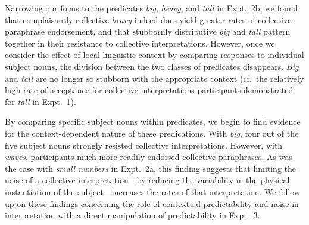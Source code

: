 \documentclass[linguex]{sp}
\newcommand{\ndg}[1]{\textcolor{Green}{[ndg: #1]}}
\begin{document}

Narrowing our focus to the predicates \emph{big}, \emph{heavy}, and \emph{tall} in Expt.~2b, we found that complaisantly collective \emph{heavy} indeed does yield greater rates of collective paraphrase endorsement, and that stubbornly distributive \emph{big} and \emph{tall} pattern together in their resistance to collective interpretations. However, once we consider the effect of local linguistic context by comparing responses to individual subject nouns, the division between the two classes of predicates disappears. \emph{Big} and \emph{tall} are no longer so stubborn with the appropriate context (cf.~the relatively high rate of acceptance for collective interpretations participants demonstrated for \emph{tall} in Expt.~1).



By comparing specific subject nouns within predicates, we begin to find evidence for the context-dependent nature of these predications. With \emph{big}, four out of the five subject nouns strongly resisted collective interpretations. However, with \emph{waves}, participants much more readily endorsed collective paraphrases. As was the case with \emph{small numbers} in Expt.~2a, this finding suggests that limiting the noise of a collective interpretation---by reducing the variability in the physical instantiation of the subject---increases the rates of that interpretation. We follow up on these findings concerning the role of contextual predictability and noise in interpretation with a direct manipulation of predictability in Expt.~3.
\end{document}
